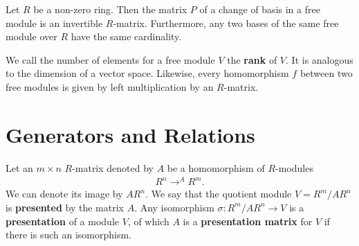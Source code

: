 \documentclass{memoir}
\begin{document}
\begin{prop}
	Let \(R\) be a non-zero ring. Then the matrix \(P\) of a change of basis in a free module is an invertible \(R\)-matrix. Furthermore, any two bases of the same free module over \(R\) have the same cardinality.
\end{prop}
We call the number of elements for a free module \(V\) the \textbf{rank} of \(V\). It is analogous to the dimension of a vector space. Likewise, every homomorphism \(f\) between two free modules is given by left multiplication by an \(R\)-matrix.

%
%

\section{Generators and Relations}
\label{sec:generators_and_relations}

\begin{defn}[Presentations]
	Let an \(m\times n\) \(R\)-matrix denoted by \(A\) be a homomorphism of \(R\)-modules
	\begin{align*}
		R^{n}\to^{A} R^{m}.
	\end{align*}
	We can denote its image by \(AR^{n}\). We say that the quotient module \(V = R^{m}/ AR^{n}\) is \textbf{presented} by the matrix \(A\). Any isomorphism \(\sigma:R^{m} / AR^{n} \to V\) is a \textbf{presentation} of a module \(V\), of which \(A\) is a \textbf{presentation matrix} for \(V\) if there is such an isomorphism.
\end{defn}
\end{document}
